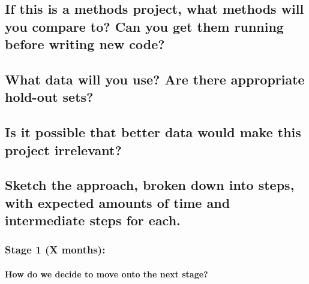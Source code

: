 \documentclass[11pt]{article}
\begin{document}
\subsection*{If this is a methods project, what methods will you compare to? Can you get them running before writing new code?}

\subsection*{What data will you use? Are there appropriate hold-out sets?}

\subsection*{Is it possible that better data would make this project irrelevant?}

\subsection*{Sketch the approach, broken down into steps, with expected amounts of time and intermediate steps for each.}

\subsubsection*{Stage 1 (X months):}

\paragraph{How do we decide to move onto the next stage?}
\end{document}
